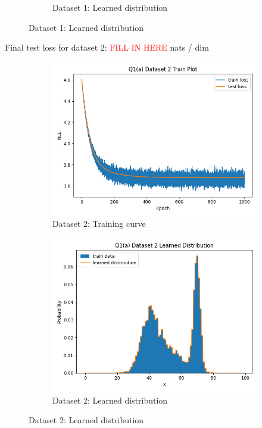 \documentclass{article}
\begin{document}
\begin{enumerate}[(a)]
\begin{figure}[H]
\begin{subfigure}{0.45\textwidth}
        \caption{Dataset 1: Learned distribution}
    \end{subfigure}
\end{figure}
Final test loss for dataset 2: \textcolor{red}{FILL IN HERE}  nats / dim
\begin{figure}[H]
    \centering
    \begin{subfigure}{0.45\textwidth}
        \centering
        \includegraphics[width=\textwidth]{figures/q1_a_dset2_train_plot.png}
        \caption{Dataset 2: Training curve}
    \end{subfigure}
    \hspace{0.2in}
    \begin{subfigure}{0.45\textwidth}
        \centering
        \includegraphics[width=\textwidth]{figures/q1_a_dset2_learned_dist.png}
        \caption{Dataset 2: Learned distribution}
    \end{subfigure}
\end{figure}


\end{enumerate}
\end{document}
